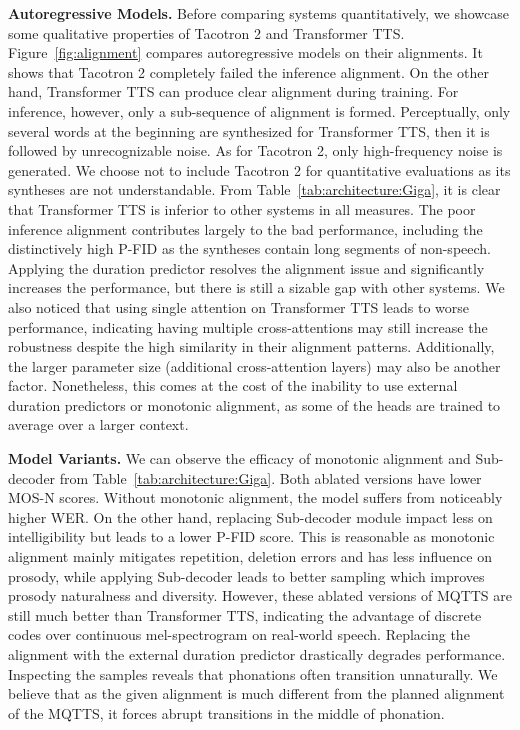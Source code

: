 \documentclass[letterpaper]{article} %
\begin{document}
\textbf{Autoregressive Models.}
Before comparing systems quantitatively, we showcase some qualitative properties of Tacotron 2 and Transformer TTS.
Figure~\ref{fig:alignment} compares autoregressive models on their alignments.
It shows that Tacotron 2 completely failed the inference alignment.
On the other hand, Transformer TTS can produce clear alignment during training.
For inference, however, only a sub-sequence of alignment is formed.
Perceptually, only several words at the beginning are synthesized for Transformer TTS, then it is followed by unrecognizable noise.
As for Tacotron 2, only high-frequency noise is generated.
We choose not to include Tacotron 2 for quantitative evaluations as its syntheses are not understandable.
From Table~\ref{tab:architecture:Giga}, it is clear that Transformer TTS is inferior to other systems in all measures.
The poor inference alignment contributes largely to the bad performance, including the distinctively high P-FID as the syntheses contain long segments of non-speech.
Applying the duration predictor resolves the alignment issue and significantly increases the performance, but there is still a sizable gap with other systems.
We also noticed that using single attention on Transformer TTS leads to worse performance, indicating having multiple cross-attentions may still increase the robustness despite the high similarity in their alignment patterns.
Additionally, the larger parameter size (additional cross-attention layers) may also be another factor.
Nonetheless, this comes at the cost of the inability to use external duration predictors or monotonic alignment, as some of the heads are trained to average over a larger context.

\textbf{Model Variants.}
We can observe the efficacy of monotonic alignment and Sub-decoder from Table~\ref{tab:architecture:Giga}.
Both ablated versions have lower MOS-N scores.
Without monotonic alignment, the model suffers from noticeably higher WER.
On the other hand, replacing Sub-decoder module impact less on intelligibility but leads to a lower P-FID score.
This is reasonable as monotonic alignment mainly mitigates repetition, deletion errors and has less influence on prosody, while applying Sub-decoder leads to better sampling which improves prosody naturalness and diversity.
However, these ablated versions of MQTTS are still much better than Transformer TTS, indicating the advantage of discrete codes over continuous mel-spectrogram on real-world speech.
Replacing the alignment with the external duration predictor drastically degrades performance.
Inspecting the samples reveals that phonations often transition unnaturally.
We believe that as the given alignment is much different from the planned alignment of the MQTTS, it forces abrupt transitions in the middle of phonation.
\end{document}
